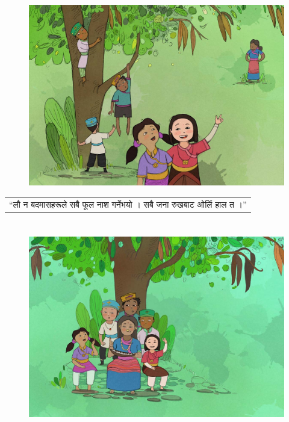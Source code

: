 \documentclass[
  letterpaper,
  DIV=11,
  numbers=noendperiod,
  paper=6in:9in,
  pagesize=pdftex,
  headinclude=on,
  footinclude=on,
  12pt]{scrreprt}
\begin{document}
\hypertarget{img}{}
\begin{figure}[H]

{\centering \includegraphics{images/p-3.jpg}

}

\end{figure}

\hypertarget{p}{}
\begin{longtable}[]{@{}l@{}}
\toprule\noalign{}
\endhead
\bottomrule\noalign{}
\endlastfoot
``लौ न बदमासहरूले सबै फूल नाश गर्नेभयो । सबै जना रुखबाट ओर्लि हाल त ।'' \\
\end{longtable}


\hypertarget{section-2}{%
\chapter{}\label{section-2}}

\hypertarget{img}{}
\begin{figure}[H]

{\centering \includegraphics{images/p-4.jpg}

}

\end{figure}
\end{document}
